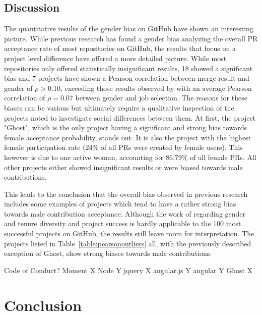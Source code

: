 \subsection{Discussion}

The quantitative results of the gender bias on GitHub have shown an interesting picture. While previous research has found a gender bias analyzing the overall \ac{PR} acceptance rate of most repositories on GitHub, the results that focus on a project level difference have offered a more detailed picture. While most repositories only offered statistically insignificant results, 18 showed a significant bias and 7 projects have shown a Pearson correlation between merge result and gender of $\rho > 0.10$, exceeding those results observed by \citeauthor{Davison2000225} with an average Pearson correlation of $\rho = 0.07$ between gender and job selection. The reasons for these biases can be various but ultimately require a qualitative inspection of the projects noted to investigate social differences between them. At first, the project "Ghost", which is the only project having a significant and strong bias towards female acceptance probability, stands out. It is also the project with the highest female participation rate (24\% of all \ac{PR}s were created by female users). This however is due to one active woman, accounting for 86.79\% of all female \ac{PR}s. All other projects either showed insignificant results or were biased towards male contributions.

This leads to the conclusion that the overall bias observed in previous research includes some examples of projects which tend to have a rather strong bias towards male contribution acceptance. Although the work of \citeauthor{Vasilescu:2015:GTD:2702123.2702549} regarding gender and tenure diversity and project success is hardly applicable to the 100 most successful projects on GitHub, the results still leave room for interpretation. The projects listed in Table~\ref{table:pearsonoutliers} all, with the previously described exception of Ghost, show strong biases towards male contributions.



Code of Conduct? Moment X Node Y jquery X angular.js Y angular Y Ghost X

\section{Conclusion}\label{Conclusion}











